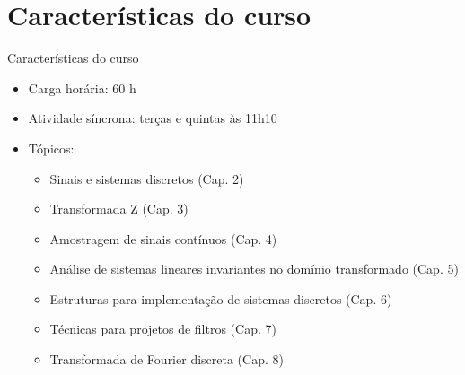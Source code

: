    \section[ slide = true]{Características do curso}
      \begin{slide}[toc=]{Características do curso}
         \begin{itemize}
            \item Carga horária: 60 h
            \item Atividade síncrona: terças e quintas às 11h10
            \item Tópicos:
            \begin{itemize}
               \item Sinais e sistemas discretos (Cap. 2)
               \item Transformada Z (Cap. 3)
               \item Amostragem de sinais contínuos (Cap. 4)
               \item Análise de sistemas lineares invariantes no domínio transformado (Cap. 5)
               \item Estruturas para implementação de sistemas discretos (Cap. 6)
               \item Técnicas para projetos de filtros (Cap. 7)
               \item Transformada de Fourier discreta (Cap. 8)
            \end{itemize}
         \end{itemize}         
      \end{slide}
      
